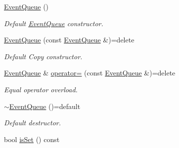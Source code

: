 \begin{DoxyCompactItemize}
\item 
\mbox{\label{class_spider_1_1_event_1_1_event_queue_a779a34719216dfbbb9db9ce8799e830f}} 
\hyperlink{class_spider_1_1_event_1_1_event_queue_a779a34719216dfbbb9db9ce8799e830f}{Event\+Queue} ()
\begin{DoxyCompactList}\small\item\em Default \hyperlink{class_spider_1_1_event_1_1_event_queue}{Event\+Queue} constructor. \end{DoxyCompactList}\item 
\mbox{\label{class_spider_1_1_event_1_1_event_queue_a5fb2a3bef9b1b6adc97b966fa64d3c5e}} 
\hyperlink{class_spider_1_1_event_1_1_event_queue_a5fb2a3bef9b1b6adc97b966fa64d3c5e}{Event\+Queue} (const \hyperlink{class_spider_1_1_event_1_1_event_queue}{Event\+Queue} \&)=delete
\begin{DoxyCompactList}\small\item\em Default Copy constructor. \end{DoxyCompactList}\item 
\mbox{\label{class_spider_1_1_event_1_1_event_queue_a4a03f4073c2920cb0ee2b83f890bedfd}} 
\hyperlink{class_spider_1_1_event_1_1_event_queue}{Event\+Queue} \& \hyperlink{class_spider_1_1_event_1_1_event_queue_a4a03f4073c2920cb0ee2b83f890bedfd}{operator=} (const \hyperlink{class_spider_1_1_event_1_1_event_queue}{Event\+Queue} \&)=delete
\begin{DoxyCompactList}\small\item\em Equal operator overload. \end{DoxyCompactList}\item 
\mbox{\label{class_spider_1_1_event_1_1_event_queue_abc1f2a5b3d1991b51084bcf220f18546}} 
\hyperlink{class_spider_1_1_event_1_1_event_queue_abc1f2a5b3d1991b51084bcf220f18546}{$\sim$\+Event\+Queue} ()=default
\begin{DoxyCompactList}\small\item\em Default destructor. \end{DoxyCompactList}\item 
bool \hyperlink{class_spider_1_1_event_1_1_event_queue_a99fe9f809cb314a0516dcd4fab4f4b20}{is\+Set} () const

\end{DoxyCompactItemize}
